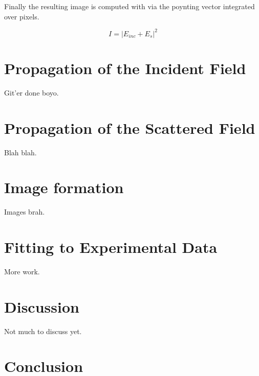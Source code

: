 Finally the resulting image is computed with via the poynting vector integrated over pixels.

\begin{equation*}
  I = \left | E_{inc} + E_{s} \right |^2 
\end{equation*}

\section{Propagation of the Incident Field}
Git'er done boyo.

\section{Propagation of the Scattered Field}

Blah blah.

\section{Image formation}

Images brah.

\section{Fitting to Experimental Data}

More work.

\section{Discussion}

Not much to discuss yet.

\section{Conclusion}



